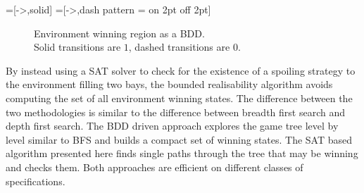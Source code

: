 =[->,solid]
=[->,dash pattern = on 2pt off 2pt]
\begin{figure}
    \centering
    \captionsetup{justification=centering}
    \caption[Environment winning region as a BDD]{Environment winning region as a BDD.\\Solid transitions are $1$, dashed transitions are $0$.}
    \label{fig:strengthsexamplebdd}
\end{figure}

By instead using a SAT solver to check for the existence of a spoiling strategy to the environment filling two bays, the bounded realisability algorithm avoids computing the set of all environment winning states. The difference between the two methodologies is similar to the difference between breadth first search and depth first search. The BDD driven approach explores the game tree level by level similar to BFS and builds a compact set of winning states. The SAT based algorithm presented here finds single paths through the tree that may be winning and checks them. Both approaches are efficient on different classes of specifications.


